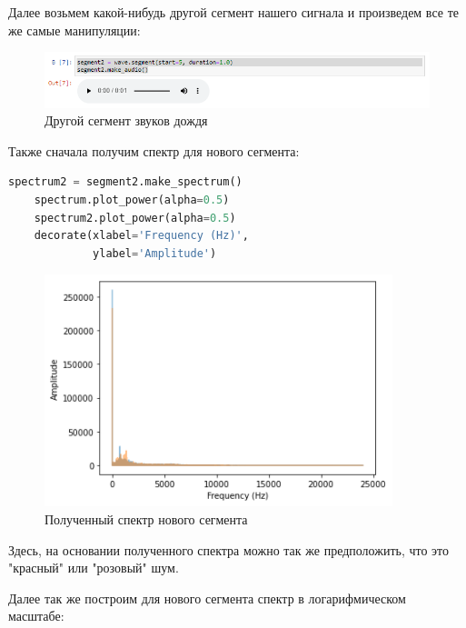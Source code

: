 \documentclass[a4paper]{article}
\begin{document}
            Далее возьмем какой-нибудь другой сегмент нашего сигнала и произведем все те же самые манипуляции:
            
             \begin{figure}[H]
                \centering
                \includegraphics[width=\textwidth]{ex_1_rain_second_segment_audio.png}
                \caption{Другой сегмент звуков дождя}
                \label{fig:ex_1_rain_second_segment_audio}
            \end{figure}
            
            Также сначала получим спектр для нового сегмента:
            
\begin{lstlisting}[language=Python, caption= Получение спектра нового сегмента]
    spectrum2 = segment2.make_spectrum()
    spectrum.plot_power(alpha=0.5)
    spectrum2.plot_power(alpha=0.5)
    decorate(xlabel='Frequency (Hz)',
             ylabel='Amplitude')
\end{lstlisting}               
            
            \begin{figure}[H]
                \centering
                \includegraphics{ex_1_rain_second_spectr.png}
                \caption{Полученный спектр нового сегмента}
                \label{fig:ex_1_rain_spectr}
            \end{figure}
            
            Здесь, на основании полученного спектра можно так же предположить, что это "красный" или "розовый" шум.
            
            Далее так же построим для нового сегмента спектр в логарифмическом масштабе:
            
\end{document}
